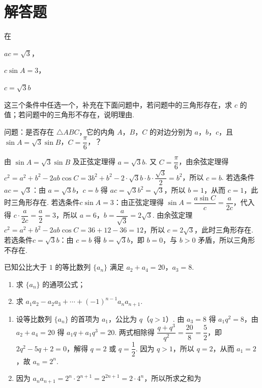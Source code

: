 \section{解答题}

\begin{problem}
在
\begin{circlelist}
\item \(ac=\sqrt3\)，
\item \(c\sin A=3\)，
\item \(c=\sqrt3 b\)
\end{circlelist}
这三个条件中任选一个，补充在下面问题中，若问题中的三角形存在，求 \(c\) 的值；若问题中的三角形不存在，说明理由.

问题：是否存在 \(\triangle ABC\)，它的内角 \(A\)，\(B\)，\(C\) 的对边分别为 \(a\)，\(b\)，\(c\)，且 \(\sin A=\sqrt3\sin B\)，\(C=\dfrac{\pi}{6}\)，\fillinblank{}？
\end{problem}

\begin{solution}
由 \(\sin A=\sqrt{3}\sin B\) 及正弦定理得 \(a=\sqrt{3}b\). 又 \(C=\dfrac{\pi}{6}\)，由余弦定理得 \(c^2=a^2+b^2-2ab\cos C=3b^2+b^2-2\cdot\sqrt3b\cdot b\cdot\dfrac{\sqrt3}{2}=b^2\)，所以 \(c=b\).
若选条件\(ac=\sqrt3\)：由 \(a=\sqrt3b\)，\(c=b\) 得 \(ac=\sqrt3b^2=\sqrt3\)，所以 \(b=1\)，从而 \(c=1\)，此时三角形存在.
若选条件\(c\sin A=3\)：由正弦定理得 \(\sin A=\dfrac{a\sin C}{c}=\dfrac a{2c}\)，代入得 \(c\cdot\dfrac a{2c}=\dfrac a2=3\)，所以 \(a=6\)，\(b=\dfrac a{\sqrt3}=2\sqrt3\). 由余弦定理 \(c^2=a^2+b^2-2ab\cos C=36+12-36=12\)，所以 \(c=2\sqrt3\)，此时三角形存在.
若选条件\(c=\sqrt3b\)：由 \(c=b\) 得 \(b=\sqrt3b\)，即 \(b=0\)，与 \(b>0\) 矛盾，所以三角形不存在.
\end{solution}

\begin{problem}
已知公比大于 \(1\) 的等比数列 \(\{a_n\}\) 满足 \(a_2+a_4=20\)，\(a_3=8\).

\begin{enumerate}
\item 求 \(\{a_n\}\) 的通项公式；
\item 求 \(a_1a_2-a_2a_3+\cdots+(-1)^{n-1}a_na_{n+1}\).
\end{enumerate}
\end{problem}

\begin{solution}
\begin{enumerate}
\item 设等比数列 \(\{a_n\}\) 的首项为 \(a_1\)，公比为 \(q\)（\(q>1\)）. 由 \(a_3=8\) 得 \(a_1q^2=8\)，由 \(a_2+a_4=20\) 得 \(a_1q+a_1q^3=20\). 两式相除得 \(\dfrac{q+q^3}{q^2}=\dfrac{20}{8}=\dfrac52\)，即 \(2q^2-5q+2=0\)，解得 \(q=2\) 或 \(q=\dfrac12\). 因为 \(q>1\)，所以 \(q=2\)，从而 \(a_1=2\)，故 \(a_n=2^n\).
\item 因为 \(a_na_{n+1}=2^n\cdot2^{n+1}=2^{2n+1}=2\cdot4^n\)，所以所求之和为
\end{enumerate}
\end{solution}

